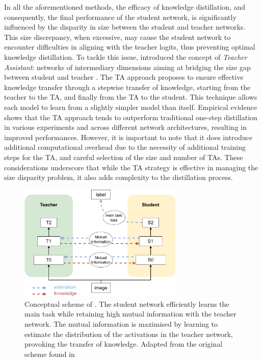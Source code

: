 In all the aforementioned methods, the efficacy of knowledge distillation, and
consequently, the final performance of the student network, is significantly
influenced by the disparity in size between the student and teacher networks.
This size discrepancy, when excessive, may cause the student network to
encounter difficulties in aligning with the teacher logits, thus preventing
optimal knowledge distillation. To tackle this issue,
\citeauthor{DBLP:conf/aaai/MirzadehFLLMG20} introduced the concept of
\emph{Teacher Assistant}: networks of intermediary dimensions aiming at bridging
the size gap between student and teacher \cite{DBLP:conf/aaai/MirzadehFLLMG20}.
The \ac{TA} approach proposes to ensure effective knowledge transfer
through a stepwise transfer of knowledge, starting from the teacher to the
\ac{TA}, and finally from the \ac{TA} to the student. This technique allows each model
to learn from a slightly simpler model than itself. Empirical evidence shows
that the \ac{TA} approach tends to outperform traditional one-step
distillation in various experiments and across different network architectures,
resulting in improved performances. However, it is important to note that it
does introduce additional computational overhead due to the necessity of
additional training steps for the \ac{TA}, and careful selection of
the size and number of \acp{TA}. These considerations underscore that
while the \ac{TA} strategy is effective in managing the size disparity
problem, it also adds complexity to the distillation process.\\


\begin{figure}[htbp]
    \centering
    \includegraphics[width=0.7\textwidth]{chapter_sota/assets/variational_info_distillation.pdf}
    \caption{Conceptual scheme of \cite{DBLP:conf/cvpr/AhnHDLD19}. The student
    network efficiently learns the main task while retaining high mutual information
    with the teacher network. The mutual information is maximised by learning to
    estimate the distribution of the activations in the teacher network, provoking
    the transfer of knowledge. Adapted from the original
    scheme found in \cite{DBLP:conf/cvpr/AhnHDLD19}}
    \label{fig:sota:vid_scheme}
\end{figure}

